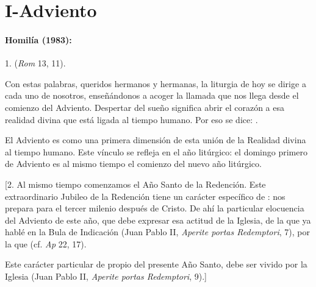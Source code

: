\chapter{I-Adviento}

\subsubsection{Homilía (1983):}


\begin{body}
	1.  (\emph{Rom} 13, 11).

	Con estas palabras, queridos hermanos y hermanas, la liturgia de hoy se dirige a cada uno de nosotros, enseñándonos a acoger la llamada que nos llega desde el comienzo del Adviento. Despertar del sueño significa abrir el corazón a esa realidad divina que está ligada al tiempo humano. Por eso se dice: .

	El Adviento es como una primera dimensión de esta unión de la Realidad divina al tiempo humano. Este vínculo se refleja en el año litúrgico: el domingo primero de Adviento es al mismo tiempo el comienzo del nuevo año litúrgico.

	{[}2. Al mismo tiempo comenzamos el Año Santo de la Redención. Este extraordinario Jubileo de la Redención tiene un carácter específico de : nos prepara para el tercer milenio después de Cristo. De ahí la particular elocuencia del Adviento de este año, que debe expresar esa actitud de la Iglesia, de la que ya hablé en la Bula de Indicación (Juan Pablo II, \emph{Aperite portas Redemptori}, 7), por la que  (cf. \emph{Ap} 22, 17).

	Este carácter particular de  propio del presente Año Santo, debe ser vivido por la Iglesia  (Juan Pablo II, \emph{Aperite portas Redemptori}, 9).{]}


\end{body}
